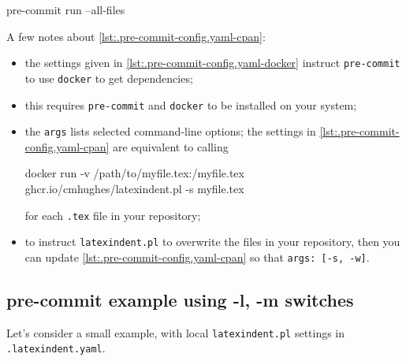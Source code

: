 \documentclass[10pt]{article}
\begin{document}
  \begin{commandshell}
pre-commit run --all-files
\end{commandshell}

  A few notes about \cref{lst:.pre-commit-config.yaml-cpan}:
  \begin{itemize}
   \item the settings given in \cref{lst:.pre-commit-config.yaml-docker} instruct
         \texttt{pre-commit} to use \texttt{docker} to get dependencies;
   \item this requires \texttt{pre-commit} and \texttt{docker} to be installed on your
         system;
   \item the \texttt{args} lists selected command-line options; the settings in
         \cref{lst:.pre-commit-config.yaml-cpan} are equivalent to calling

         \begin{commandshell}
docker run -v /path/to/myfile.tex:/myfile.tex ghcr.io/cmhughes/latexindent.pl -s myfile.tex
\end{commandshell}

         for each \texttt{.tex} file in your repository;
   \item to instruct \texttt{latexindent.pl} to overwrite the files in your repository,
         then you can update \cref{lst:.pre-commit-config.yaml-cpan} so that
         \texttt{args: [-s, -w]}.
  \end{itemize}

 \subsection{pre-commit example using -l, -m switches}
  Let's consider a small example, with local \texttt{latexindent.pl} settings in
  \texttt{.latexindent.yaml}.
\end{document}

